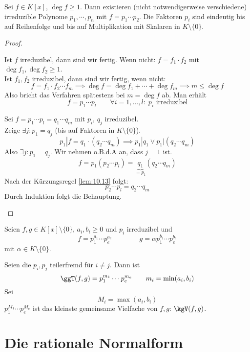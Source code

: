 \documentclass{mycourse}
\begin{document}
\begin{thm}
\label{thm:12.5}
Sei $f\in K[x]$, $\deg f\ge 1$.
Dann existieren (nicht notwendigerweise verschiedene) irreduzible Polynome $p_1,\cdots,p_n$ mit
$f=p_1\cdots p_2$.
Die Faktoren $p_i$ sind eindeutig bis auf Reihenfolge und bis auf Multiplikation mit Skalaren in $K\setminus \{0\}$.

\begin{proof}
	\begin{seg}[Existenz:]
Ist $f$ irreduzibel, dann sind wir fertig.
Wenn nicht: $f=f_1\cdot f_2$ mit $\deg f_1,\deg f_2 \ge 1$.\\
Ist $f_1, f_2$ irreduzibel, dann sind wir fertig, wenn nicht:\\
\[
f=f_1\cdot f_2\cdots f_m \implies \deg f=\deg f_1 + \dotsb + \deg f_m \implies m\le \deg f
\]
Also bricht das Verfahren spätestens bei $m=\deg f$ ab.
Man erhält
\[
	f=p_1\dotsb p_l \qquad \forall i=1,\dotsc,l :\; p_i \text{ irreduzibel}
\]
\end{seg}

\begin{seg}[Eindeutigkeit:]
Sei $f=p_1\dotsb p_l=q_1\dotsb q_m$ mit $p_i$, $q_j$ irreduzibel.
\\Zeige $\exists j:p_1=q_j$ (bis auf Faktoren in $K \setminus \{0\}$).
\[
p_1|f = q_1\cdot (q_2\dotsb q_m) \implies p_1|q_1 \lor p_1|(q_2\dotsb q_m)
\]
Also $\exists j:p_1=q_j$.
Wir nehmen o.B.d.A an, dass $j=1$ ist.
\[
f=p_1(p_2\dotsb p_l) = \underbrace{q_1}_{=p_1}(q_2\dotsb q_m)
\]
Nach der Kürzungsregel \ref{lem:10.13} folgt:
\[
p_2\dotsb p_l = q_2 \dotsb q_m
\]
Durch Induktion folgt die Behauptung.
\end{seg}
\end{proof}
\end{thm}

Seien $f,g\in K[x]\setminus \{0\}$, $a_i,b_i\ge 0$ und $p_i$ irreduzibel und
\[
	f=p_1^{a_1} \dotsb p_e^{a_e} \qquad\qquad g=\alpha p_1^{b_1}\dotsb p_e^{b_e}
\]
mit $\alpha \in K\setminus \{0\}$.

Seien die $p_i,p_j$ teilerfremd für $i\neq j$.
Dann ist
\[
\ggT(f,g) = p_1^{m_1}\dotsb p_e^{m_e} \qquad {m_i=\min(a_i,b_i)}
\]
Sei
\[
M_i =\max(a_i,b_i)
\]
$p_1^{M_1}\dotsb p_e^{M_e}$ ist das kleinste gemeinsame Vielfache von $f,g$: $\kgV(f,g)$.


\section{Die rationale Normalform}
\end{document}
